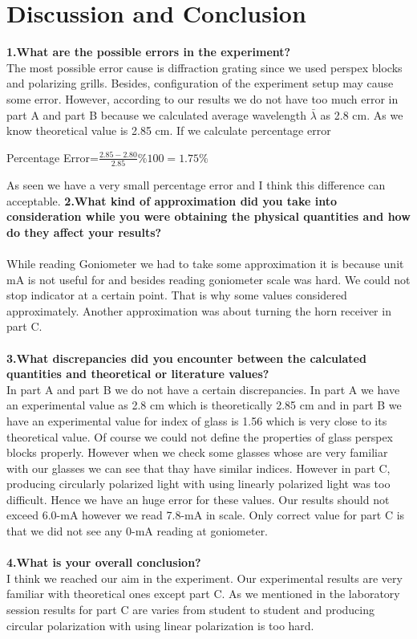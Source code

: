 \documentclass[a4paper,12pt]{report}
\begin{document}
\chapter{Discussion and Conclusion}
\textbf{1.What are the possible errors in the experiment?}\\
The most possible error cause is diffraction grating since we used perspex blocks and polarizing grills. Besides, configuration of the experiment setup may cause some error. However, according to our results we do not have too much error in part A and part B because we calculated average wavelength $\bar{\lambda}$ as 2.8 cm. As we know theoretical value is 2.85 cm. If we calculate percentage error
\begin{center}
	Percentage Error=$\frac{2.85-2.80}{2.85}\%100$$=1.75\%$  
\end{center}
As seen we have a very small percentage error and I think this difference can acceptable.
\textbf{2.What kind of approximation did you take into consideration while you were obtaining the physical quantities and how do they affect your results?}\\\\
While reading Goniometer we had to take some approximation it is because unit mA is not useful for and besides reading goniometer scale was hard. We could not stop indicator at a certain point. That is why some values considered approximately. Another approximation was about turning the horn receiver in part C.\\\\  
\textbf{3.What discrepancies did you encounter between the calculated quantities and theoretical or literature values?}\\
In part A and part B we do not have a certain discrepancies. In part A we have an experimental value as 2.8 cm which is theoretically 2.85 cm and in part B we have an experimental value for index of glass is 1.56 which is very close to its theoretical value. Of course we could not define the properties of glass perspex blocks properly. However when we check some glasses whose are very familiar with our glasses we can see that thay have similar indices. However in part C, producing circularly polarized light with using linearly polarized light was too difficult. Hence we have an huge error for these values. Our results should not exceed 6.0-mA however we read 7.8-mA in scale. Only correct value for part C is that we did not see any 0-mA reading at goniometer.\\\\ 
\textbf{4.What is your overall conclusion?}\\
I think we reached our aim in the experiment. Our experimental results are very familiar with theoretical ones except part C. As we mentioned in the laboratory session results for part C are varies from student to student and producing circular polarization with using linear polarization is too hard. 
\end{document}
